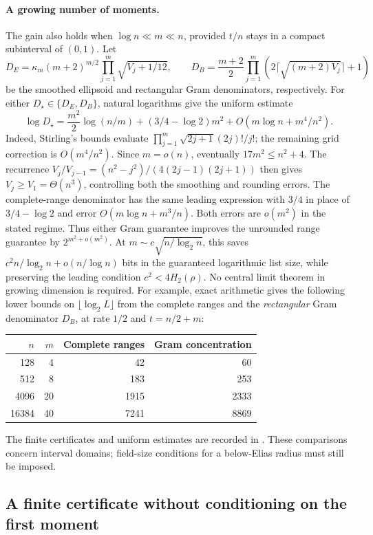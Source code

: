 \documentclass[11pt,letterpaper]{article}
\theoremstyle{definition}
\theoremstyle{remark}
\begin{document}
\paragraph{A growing number of moments.}
The gain also holds when $\log n\ll m\ll n$, provided $t/n$ stays
in a compact subinterval of $(0,1)$. Let
\[
 D_E=\kappa_m(m+2)^{m/2}\prod_{j=1}^m\sqrt{V_j+1/12},\qquad
 D_B=\frac{m+2}{2}
       \prod_{j=1}^m(2\lceil\sqrt{(m+2)V_j}\rceil+1)
\]
be the smoothed ellipsoid and rectangular Gram denominators,
respectively. For either $D_\star\in\{D_E,D_B\}$, natural logarithms
give the uniform estimate
\[
 \log D_\star=\frac{m^2}{2}\log(n/m)
 +(3/4-\log2)m^2+O(m\log n+m^4/n^2).
\]
Indeed, Stirling's bounds evaluate
$\prod_{j=1}^m\sqrt{2j+1}(2j)!/j!$; the remaining grid correction
is $O(m^4/n^2)$. Since $m=o(n)$, eventually
$17m^2\le n^2+4$. The recurrence
$V_j/V_{j-1}=(n^2-j^2)/(4(2j-1)(2j+1))$ then gives
$V_j\ge V_1=\Theta(n^3)$, controlling both the smoothing and rounding
errors. The complete-range denominator has the same leading expression
with $3/4$ in place of $3/4-\log2$ and error
$O(m\log n+m^3/n)$. Both errors are $o(m^2)$ in the stated regime.
Thus either Gram guarantee improves the unrounded range guarantee by
$2^{m^2+o(m^2)}$. At $m\sim c\sqrt{n/\log_2n}$, this saves
$c^2n/\log_2n+o(n/\log n)$ bits in the guaranteed logarithmic list
size, while preserving the leading condition $c^2<4H_2(\rho)$.
No central limit theorem in growing dimension is required.
For example, exact arithmetic gives the following lower bounds on
$\lfloor\log_2L\rfloor$ from the complete ranges and the
\emph{rectangular} Gram denominator $D_B$, at rate $1/2$ and
$t=n/2+m$:
\begin{center}
\begin{tabular}{rrrr}
\toprule
$n$ & $m$ & Complete ranges & Gram concentration\\
\midrule
128 & 4 & 42 & 60\\
512 & 8 & 183 & 253\\
4096 & 20 & 1915 & 2333\\
16384 & 40 & 7241 & 8869\\
\bottomrule
\end{tabular}
\end{center}
The finite certificates and uniform estimates are recorded in
. These comparisons concern interval domains;
field-size conditions for a below-Elias radius must still be imposed.

\subsection{A finite certificate without conditioning on the first moment}
\label{sec:radial-certificate}
\end{document}
